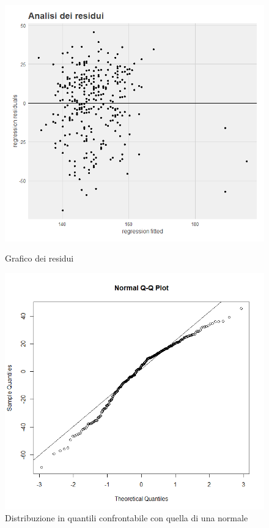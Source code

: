 \documentclass{article}
\begin{document}
\begin{figure}[!htb]
   \begin{minipage}{0.475\textwidth}
     \centering
     \includegraphics[width=1\linewidth]{analisi residui}
     \caption{Grafico dei residui}
     \label{Fig:ds1}
   \end{minipage}\hfill
   \begin{minipage}{0.475\textwidth}
     \centering
     \includegraphics[width=1\linewidth]{qq plot}
     \caption{Distribuzione in quantili confrontabile con quella di una normale }
     \label{Fig:ds1}
   \end{minipage}
\end{figure}
\end{document}
